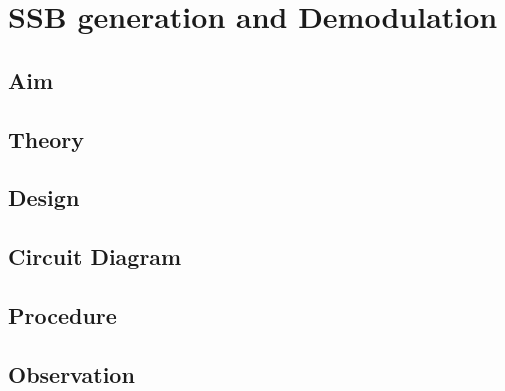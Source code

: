 \documentclass{book}
\begin{document}
\chapter[SSB generation and Demodulation]{SSB generation and Demodulation}
\section*{Aim}
\section*{Theory}
\section*{Design}
\section*{Circuit Diagram}
\section*{Procedure}
\section*{Observation}
\end{document}
